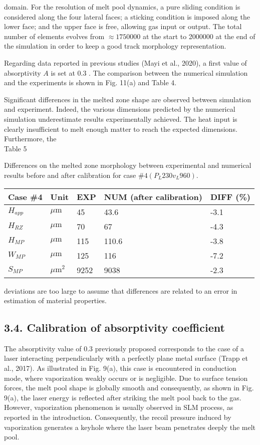 \documentclass[10pt]{article}
\begin{document}
domain. For the resolution of melt pool dynamics, a pure sliding condition is considered along the four lateral faces; a sticking condition is imposed along the lower face; and the upper face is free, allowing gas input or output. The total number of elements evolves from $\approx 1750000$ at the start to 2000000 at the end of the simulation in order to keep a good track morphology representation.

Regarding data reported in previous studies (Mayi et al., 2020), a first value of absorptivity $A$ is set at 0.3 . The comparison between the numerical simulation and the experiments is shown in Fig. 11(a) and Table 4.

Significant differences in the melted zone shape are observed between simulation and experiment. Indeed, the various dimensions predicted by the numerical simulation underestimate results experimentally achieved. The heat input is clearly insufficient to melt enough matter to reach the expected dimensions. Furthermore, the\\
Table 5

Differences on the melted zone morphology between experimental and numerical results before and after calibration for case $\# 4\left(P_{L} 230 v_{L} 960\right)$.

\begin{center}
\begin{tabular}{lllll}
\hline
Case \#4 & Unit & EXP & NUM (after calibration) & DIFF (\%) \\
\hline
$H_{a p p}$ & $\mu \mathrm{m}$ & 45 & 43.6 & -3.1 \\
$H_{R Z}$ & $\mu \mathrm{m}$ & 70 & 67 & -4.3 \\
$H_{M P}$ & $\mu \mathrm{m}$ & 115 & 110.6 & -3.8 \\
$W_{M P}$ & $\mu \mathrm{m}$ & 125 & 116 & -7.2 \\
$S_{M P}$ & $\mu \mathrm{m}^{2}$ & 9252 & 9038 & -2.3 \\
\hline
\end{tabular}
\end{center}

deviations are too large to assume that differences are related to an error in estimation of material properties.

\subsection*{3.4. Calibration of absorptivity coefficient}
The absorptivity value of 0.3 previously proposed corresponds to the case of a laser interacting perpendicularly with a perfectly plane metal surface (Trapp et al., 2017). As illustrated in Fig. 9(a), this case is encountered in conduction mode, where vaporization weakly occurs or is negligible. Due to surface tension forces, the melt pool shape is globally smooth and consequently, as shown in Fig. 9(a), the laser energy is reflected after striking the melt pool back to the gas. However, vaporization phenomenon is usually observed in SLM process, as reported in the introduction. Consequently, the recoil pressure induced by vaporization generates a keyhole where the laser beam penetrates deeply the melt pool.
\end{document}

